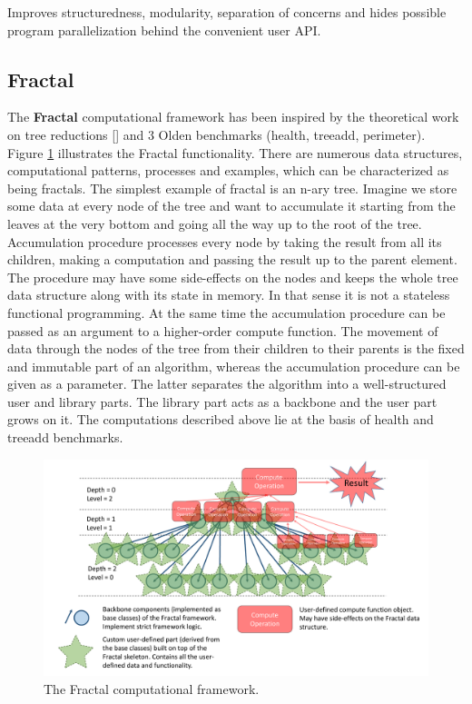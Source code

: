 \quad Improves structuredness, modularity, separation of concerns and hides possible program parallelization behind the convenient user API.  

\subsection{Fractal}
\quad The \textbf{Fractal} computational framework has been inspired by the theoretical work on tree reductions [] and 3 Olden benchmarks (health, treeadd, perimeter). Figure \ref{fig:fractal} illustrates the Fractal functionality.\newline\null
\quad There are numerous data structures, computational patterns, processes and examples, which can be characterized as being fractals.\newline\null
\quad The simplest example of fractal is an n-ary tree. Imagine we store some data at every node of the tree and want to accumulate it starting from the leaves at the very bottom and going all the way up to the root of the tree. Accumulation procedure processes every node by taking the result from all its children, making a computation and passing the result up to the parent element. The procedure may have some side-effects on the nodes and keeps the whole tree data structure along with its state in memory. In that sense it is not a stateless functional programming. At the same time the accumulation procedure can be passed as an argument to a higher-order compute function. The movement of data through the nodes of the tree from their children to their parents is the fixed and immutable part of an algorithm, whereas the accumulation procedure can be given as a parameter. The latter separates the algorithm into a well-structured user and library parts. The library part acts as a backbone and the user part grows on it. The computations described above lie at the basis of health and treeadd benchmarks.\newline\null
\begin{figure}[ht]
\includegraphics[width=1.0\textwidth]{images/Fractal.pdf}
\caption{The Fractal computational framework.}
\label{fig:fractal}
\end{figure}

